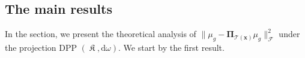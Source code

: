 \documentclass[twoside,11pt]{book}
\numberwithin{theorem}{chapter}
\numberwithin{definition}{chapter}
\numberwithin{proposition}{chapter}
\numberwithin{corollary}{chapter}
\numberwithin{example}{chapter}
\numberwithin{lemma}{chapter}
\DeclareMathOperator{\Tran}{\intercal}
\DeclareMathOperator*{\KDPP}{\mathfrak{K}}
\begin{document}





\subsection{The main results}
\label{subsec:unreg_opt_problem}




In the section, we present the theoretical analysis of $\|\mu_{g} - \bm{\Pi}_{\mathcal{T}(\bm{x})} \mu_{g}\|_{\mathcal{F}}^{2}$ under the projection DPP $(\KDPP, \mathrm{d}\omega)$. We start by the first result.
\end{document}

